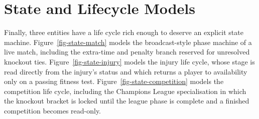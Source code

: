 









\section{State and Lifecycle Models}
\label{sec:design-state}

Finally, three entities have a life cycle rich enough to deserve an explicit
state machine. Figure~\ref{fig-state-match} models the broadcast-style phase
machine of a live match, including the extra-time and penalty branch reserved
for unresolved knockout ties. Figure~\ref{fig-state-injury} models the injury
life cycle, whose stage is read directly from the injury's status and which
returns a player to availability only on a passing fitness test.
Figure~\ref{fig-state-competition} models the competition life cycle, including
the Champions League specialisation in which the knockout bracket is locked
until the league phase is complete and a finished competition becomes read-only.




